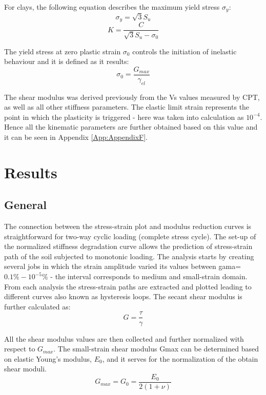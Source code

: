 \documentclass[11pt,a4paper]{report}
\begin{document}
For clays, the following equation describes the maximum yield stress $\sigma_y$:
\begin{equation}
	\sigma_y=\sqrt{3}S_u
\end{equation}
\begin{equation}
	K= \frac{C}{\sqrt{3}S_u-\sigma_0}
\end{equation}

The yield stress at zero plastic strain $\sigma_0$ controls the initiation of inelastic behaviour and it is defined as it results:
\begin{equation}
	\sigma_0=\frac{G_{max}}{\gamma_{el}}
\end{equation}

The shear modulus was derived previously from the Vs values measured by CPT, as well as all other stiffness parameters. The elastic limit strain represents the point in which the plasticity is triggered - here was taken into calculation as $10^{-4}$. Hence all the kinematic parameters are further obtained based on this value and it can be seen in Appendix \ref{App:AppendixF}.

\newpage
\section{Results}
\subsection{General}
The connection between the stress-strain plot and modulus reduction curves is straightforward for two-way cyclic loading (complete stress cycle). The set-up of the normalized stiffness degradation curve allows the prediction of stress-strain path of the soil subjected to monotonic loading. 
The analysis starts by creating several jobs in which the strain amplitude varied its values between \gls{gama}=$0.1\%-10^{-5}\%$ - the interval corresponds to medium and small-strain domain. From each analysis the stress-strain paths are extracted and plotted leading to different curves also known as hysteresis loops. The secant shear modulus is further calculated as:
\begin{equation}
	G=\frac{\tau}{\gamma}
\end{equation}

All the shear modulus values are then collected and further normalized with respect to $G_{max}$. The small-strain shear modulus Gmax can be determined based on elastic Young's modulus, $E_0$, and it serves for the normalization of the obtain shear moduli. 
\begin{equation}
	G_{max} = G_0=\frac{E_0}{2(1+\nu)}
\end{equation}
\end{document}
